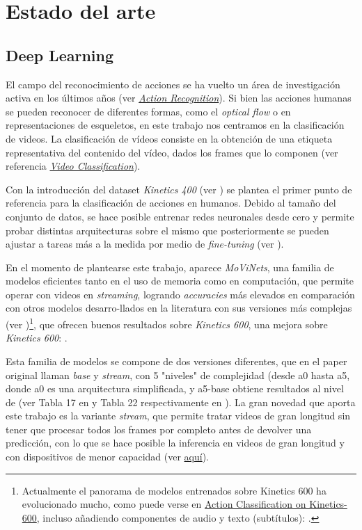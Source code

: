 \chapter{Estado del arte}\label{estado_del_arte}

\section{Deep Learning}

El campo del reconocimiento de acciones se ha vuelto un área de investigación activa en los últimos años (ver \href{https://paperswithcode.com/task/action-recognition-in-videos}{\textit{Action Recognition}}). Si bien las acciones humanas se pueden reconocer de diferentes formas, como el \textit{optical flow} o en representaciones de esqueletos, en este trabajo nos centramos en la clasificación de videos. La clasificación de vídeos consiste en la obtención de una etiqueta representativa del contenido del vídeo, dados los frames que lo componen (ver referencia \href{Video Classification is the task of producing a label that is relevant to the video given its frames}{\textit{Video Classification}}).

Con la introducción del dataset \textit{Kinetics 400} (ver \cite{Kinetics400}) se plantea el primer punto de referencia para la clasificación de acciones en humanos. Debido al tamaño del conjunto de datos, se hace posible entrenar redes neuronales desde cero y permite probar distintas arquitecturas sobre el mismo que posteriormente se pueden ajustar a tareas más a la medida por medio de \textit{fine-tuning} (ver \cite{I3D}).

En el momento de plantearse este trabajo, aparece \textit{MoViNets}, una familia de modelos eficientes tanto en el uso de memoria como en computación, que permite operar con videos en \textit{streaming}, logrando  \textit{accuracies} más elevados en comparación con otros modelos desarro-llados en la literatura con sus versiones más complejas (ver \cite{MoViNets})\footnote{Actualmente el panorama de modelos entrenados sobre Kinetics 600 ha evolucionado mucho, como puede verse en \href{https://paperswithcode.com/sota/action-classification-on-kinetics-600}{Action Classification on Kinetics-600}, incluso añadiendo componentes de audio y texto (subtítulos): \cite{Merlot}.}, que ofrecen buenos resultados sobre \textit{Kinetics 600}, una mejora sobre \textit{Kinetics 600}: \cite{Kinetics600}.

Esta familia de modelos se compone de dos versiones diferentes, que en el paper original llaman \textit{base} y \textit{stream}, con 5 "niveles" de complejidad (desde a0 hasta a5, donde a0 es una arquitectura simplificada, y a5-base obtiene resultados al nivel de \cite{X3D} (ver Tabla 17 en y Tabla 22 respectivamente en \cite{MoViNets}). La gran novedad que aporta este trabajo es la variante \textit{stream}, que permite tratar videos de gran longitud sin tener que procesar todos los frames por completo antes de devolver una predicción, con lo que se hace posible la inferencia en videos de gran longitud y con dispositivos de menor capacidad (ver \href{https://blog.tensorflow.org/2022/04/video-classification-on-edge-devices.html}{aquí}).


